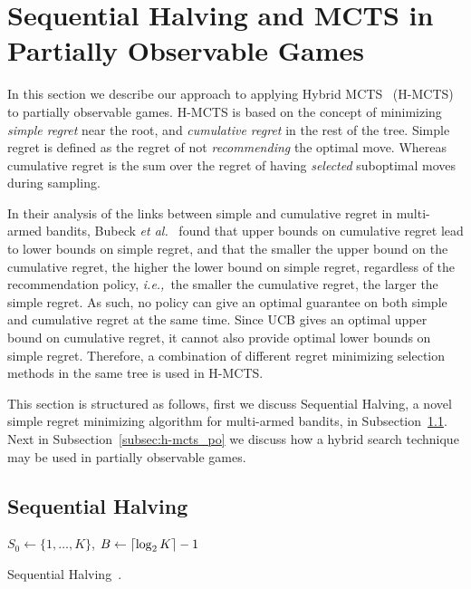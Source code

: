 \documentclass[a4paper]{llncs}
\DeclarePairedDelimiter{\ceil}{\lceil}{\rceil}
\DeclarePairedDelimiter{\floor}{\lfloor}{\rfloor}
\newcommand{\ie}{{\it i.e.,}~}
\begin{document}
\section{Sequential Halving and MCTS in Partially Observable Games}
\label{sec:h-mcts}

In this section we describe our approach to applying Hybrid MCTS~\cite{Pepels14hmcts} (H-MCTS) to partially observable games. H-MCTS is based on the concept of minimizing \emph{simple regret} near the root, and \emph{cumulative regret} in the rest of the tree. Simple regret is defined as the regret of not \emph{recommending} the optimal move. Whereas cumulative regret is the sum over the regret of having \emph{selected} suboptimal moves during sampling.

In their analysis of the links between simple and cumulative regret in multi-armed bandits, Bubeck \emph{et al.}~\cite{Bubeck11Pure} found that upper bounds on cumulative regret lead to lower bounds on simple regret, and that the smaller the upper bound on the cumulative regret, the higher the lower bound on simple regret, regardless of the recommendation policy, \ie the smaller the cumulative regret, the larger the simple regret. As such, no policy can give an optimal guarantee on both simple and cumulative regret at the same time. Since UCB gives an optimal upper bound on cumulative regret, it cannot also provide optimal lower bounds on simple regret. Therefore, a combination of different regret minimizing selection methods in the same tree is used in H-MCTS.

This section is structured as follows, first we discuss Sequential Halving, a novel simple regret minimizing algorithm for multi-armed bandits, in Subsection~\ref{subsec:seq_halving}. Next in Subsection~\ref{subsec:h-mcts_po} we discuss how a hybrid search technique may be used in partially observable games.

\subsection{Sequential Halving}
\label{subsec:seq_halving}

\IncMargin{1em}
\begin{algorithm2e}[ht]
	\vspace{0.05cm}
	$S_0 \gets \{1,\dots,K\}$,
	$B \gets \ceil{\log_2{K}} - 1$														\;
	\BlankLine
  \caption[Sequential Halving]{Sequential Halving~\protect\cite{Karnin13SH}. \label{alg:seqhalv}}
\end{algorithm2e}
\DecMargin{1em}
\end{document}
